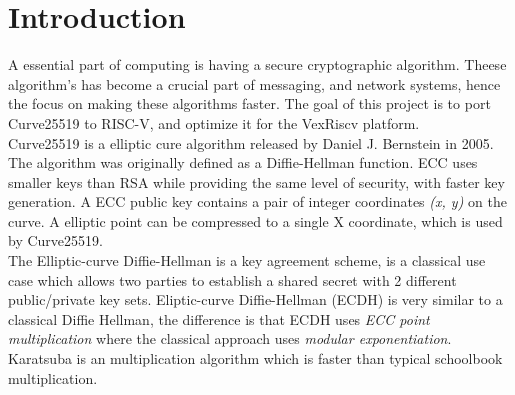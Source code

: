 \section{Introduction}
A essential part of computing is having a secure cryptographic algorithm. Theese algorithm's has become a crucial part of messaging, and network systems, hence the focus on making these algorithms faster.
The goal of this project is to port Curve25519 to RISC-V, and optimize it for the VexRiscv platform.
\\
Curve25519 is a elliptic cure algorithm released by Daniel J. Bernstein in 2005. The algorithm was originally defined as a Diffie-Hellman function.
ECC uses smaller keys than RSA while providing the same level of security, with faster key generation.
A ECC public key contains a pair of integer coordinates \textit{(x, y)} on the curve. A elliptic point can be compressed to a single X coordinate, which is used by Curve25519.
\\
The Elliptic-curve Diffie-Hellman is a key agreement scheme, is a classical use case which allows two parties to establish a shared secret with 2 different public/private key sets. 
Eliptic-curve Diffie-Hellman (ECDH) is very similar to a classical Diffie Hellman, the difference is that ECDH uses \textit{ECC point multiplication} where the classical approach uses \textit{modular exponentiation}.\\
Karatsuba is an multiplication algorithm which is faster than typical schoolbook multiplication. 
\pagebreak